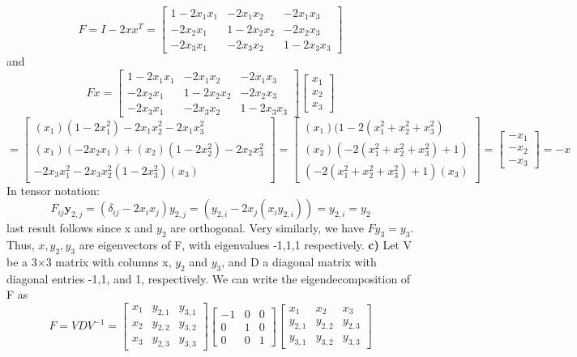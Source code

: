 \documentclass[12pt,letterpaper]{article}
\begin{document}
$$F = I - 2 x x^T =
\begin{bmatrix}
1-2x_1 x_1 & -2x_1 x_2 & -2x_1 x_3 \\
-2x_2 x_1 & 1-2x_2 x_2 & -2x_2 x_3 \\
-2x_3 x_1 & -2x_3 x_2 & 1-2x_3 x_3 
\end{bmatrix}
$$and
$$ F x = 
\begin{bmatrix}
1-2x_1 x_1 & -2x_1 x_2 & -2x_1 x_3 \\
-2x_2 x_1 & 1-2x_2 x_2 & -2x_2 x_3 \\
-2x_3 x_1 & -2x_3 x_2 & 1-2x_3 x_3 
\end{bmatrix}
\begin{bmatrix}
x_1 \\
x_2 \\
x_3
\end{bmatrix}  $$
$$ = \begin{bmatrix}
(x_1)(1-2x_1^2) -2x_1 x_2^2 -2x_1 x_3^2 \\
(x_1)(-2x_2 x_1) + (x_2)(1-2x_2^2 ) -2x_2 x_3^2  \\
-2x_3 x_1^2 -2x_3 x_2^2  (1-2x_3^2 ) (x_3)
\end{bmatrix}
 =\begin{bmatrix}
(x_1)(1-2(x_1^2+x_2^2+x_3^2) \\
(x_2)(-2(x_1^2 + x_2^2+x_3^2)+1)  \\
(-2(x_1^2+ x_2^2 + x_3^2)+1) (x_3)
\end{bmatrix}
  = \begin{bmatrix}
-x_1\\
-x_2  \\
-x_3
\end{bmatrix} = -x$$
In tensor notation:
$$ F_{ij}\mathbf{y}_{2,j} = (\delta_{ij} - 2 x_i x_j) y_{2,j} = (y_{2,i} - 2  x_j (x_i y_{2,i}))= y_{2,i}=y_2 $$
last result follows since x and $y_2$ are orthogonal. Very similarly, we have $ F y_3 =y_3$. 
\newline Thus, $x,y_2,y_3$ are eigenvectors of F, with eigenvalues -1,1,1 respectively.
\newline
\newline \textbf{c)} Let V be a 3$\times $3 matrix with columns x, $y_2$ and $y_3$, and D a diagonal matrix with diagonal entries -1,1, and 1, respectively. We can write the eigendecomposition of F as
$$ F = VDV^{-1} = \begin{bmatrix}
x_1 & y_{2,1} &  y_{3,1}\\
x_2 & y_{2,2}& y_{3,2} \\
x_3 &  y_{2,3} & y_{3,3}
\end{bmatrix} 
\begin{bmatrix}
-1 & 0 &  0\\
0 & 1 & 0\\
0 & 0 & 1
\end{bmatrix} 
\begin{bmatrix}
x_1 &x_2  &  x_3\\
y_{2,1} & y_{2,2}&  y_{2,3} \\
y_{3,1} &y_{3,2}  & y_{3,3}
\end{bmatrix}
$$  
\end{document}
